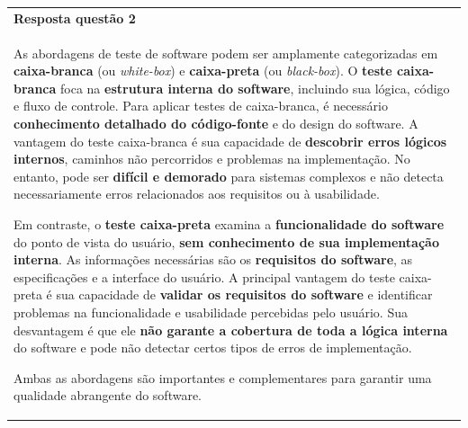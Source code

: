 \documentclass[
]{book}
\begin{document}
\begin{longtable}[]{@{}
  >{\raggedright\arraybackslash}p{}@{}}
\toprule\noalign{}
\endhead
\bottomrule\noalign{}
\endlastfoot
\textbf{Resposta questão 2} \\
As abordagens de teste de software podem ser amplamente categorizadas em \textbf{caixa-branca} (ou \emph{white-box}) e \textbf{caixa-preta} (ou \emph{black-box}). O \textbf{teste caixa-branca} foca na \textbf{estrutura interna do software}, incluindo sua lógica, código e fluxo de controle. Para aplicar testes de caixa-branca, é necessário \textbf{conhecimento detalhado do código-fonte} e do design do software. A vantagem do teste caixa-branca é sua capacidade de \textbf{descobrir erros lógicos internos}, caminhos não percorridos e problemas na implementação. No entanto, pode ser \textbf{difícil e demorado} para sistemas complexos e não detecta necessariamente erros relacionados aos requisitos ou à usabilidade.

Em contraste, o \textbf{teste caixa-preta} examina a \textbf{funcionalidade do software} do ponto de vista do usuário, \textbf{sem conhecimento de sua implementação interna}. As informações necessárias são os \textbf{requisitos do software}, as especificações e a interface do usuário. A principal vantagem do teste caixa-preta é sua capacidade de \textbf{validar os requisitos do software} e identificar problemas na funcionalidade e usabilidade percebidas pelo usuário. Sua desvantagem é que ele \textbf{não garante a cobertura de toda a lógica interna} do software e pode não detectar certos tipos de erros de implementação.

Ambas as abordagens são importantes e complementares para garantir uma qualidade abrangente do software. \\
\end{longtable}
\end{document}
